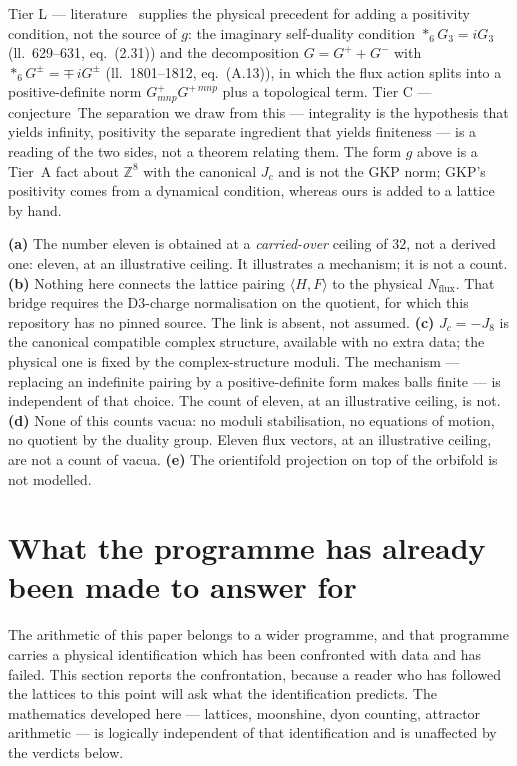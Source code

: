 \documentclass[11pt,a4paper]{article}
\theoremstyle{remark}
\newcommand{\tierL}{\colorbox{blue!10}{\textsf{\scriptsize Tier L --- literature}}}
\newcommand{\tierC}{\colorbox{orange!15}{\textsf{\scriptsize Tier C --- conjecture}}}
\begin{document}
\tierL\ \cite{GKP2001} supplies the physical precedent for adding a positivity condition, not the source of $g$:
the imaginary self-duality condition $*_6 G_3 = i G_3$ (ll.~629--631, eq.~(2.31)) and the decomposition
$G = G^{+} + G^{-}$ with $*_6 G^{\pm} = \mp\, i G^{\pm}$ (ll.~1801--1812, eq.~(A.13)), in which the flux action
splits into a positive-definite norm $G^{+}_{mnp}G^{+\,mnp}$ plus a topological term. \tierC\ The separation we
draw from this --- integrality is the hypothesis that yields infinity, positivity the separate ingredient that
yields finiteness --- is a reading of the two sides, not a theorem relating them. The form $g$ above is a Tier~A
fact about $\mathbb{Z}^8$ with the canonical $J_c$ and is not the GKP norm; GKP's positivity comes from a
dynamical condition, whereas ours is added to a lattice by hand.

\begin{scopebox}
\textbf{(a)} The number eleven is obtained at a \emph{carried-over} ceiling of $32$, not a derived one: eleven,
at an illustrative ceiling. It illustrates a mechanism; it is not a count.
\textbf{(b)} Nothing here connects the lattice pairing $\langle H,F\rangle$ to the physical
$N_{\mathrm{flux}}$. That bridge requires the D3-charge normalisation on the quotient, for which this
repository has no pinned source. The link is absent, not assumed.
\textbf{(c)} $J_c = -J_8$ is the canonical compatible complex structure, available with no extra data; the
physical one is fixed by the complex-structure moduli. The mechanism --- replacing an indefinite pairing by a
positive-definite form makes balls finite --- is independent of that choice. The count of eleven, at an
illustrative ceiling, is not.
\textbf{(d)} None of this counts vacua: no moduli stabilisation, no equations of motion, no quotient by the
duality group. Eleven flux vectors, at an illustrative ceiling, are not a count of vacua.
\textbf{(e)} The orientifold projection on top of the orbifold is not modelled.
\end{scopebox}


\section{What the programme has already been made to answer for}\label{sec:exp}

The arithmetic of this paper belongs to a wider programme, and that programme carries a
physical identification which has been confronted with data and has failed. This section
reports the confrontation, because a reader who has followed the lattices to this point will
ask what the identification predicts. The mathematics developed here --- lattices, moonshine,
dyon counting, attractor arithmetic --- is logically independent of that identification and is
unaffected by the verdicts below.
\end{document}
